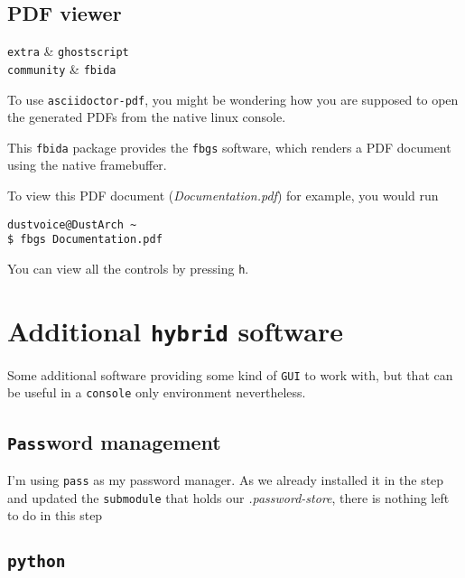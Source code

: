 \documentclass[10pt]{dustdoc}
\begin{document}
\subsection{PDF viewer}
\label{sec:console-pdf-viewer}

\begin{packagetable}
    \texttt{extra} & \texttt{ghostscript} \\
    \texttt{community} & \texttt{fbida} \\
\end{packagetable}

To use \texttt{asciidoctor-pdf}, you might be wondering how you are supposed to open the generated PDFs from the native linux console.

This \texttt{fbida} package provides the \texttt{fbgs} software, which renders a PDF document using the native framebuffer.

To view this PDF document (\textit{Documentation.pdf}) for example, you would run

\begin{verbatim}
dustvoice@DustArch ~
$ fbgs Documentation.pdf
\end{verbatim}

\begin{NOTE}
    You can view all the controls by pressing \texttt{h}.
\end{NOTE}

\section{Additional \texttt{hybrid} software}
\label{sec:additional-hybrid-software}

Some additional software providing some kind of \texttt{GUI} to work with, but that can be useful in a \texttt{console} only environment nevertheless.

\subsection{\texttt{Pass}word management}
\label{sec:password-management}

I’m using \texttt{pass} as my password manager.
As we already installed it in the  step and updated the \texttt{submodule} that holds our \textit{.password-store}, there is nothing left to do in this step

\subsection{\texttt{python}}
\label{sec:python}
\end{document}
